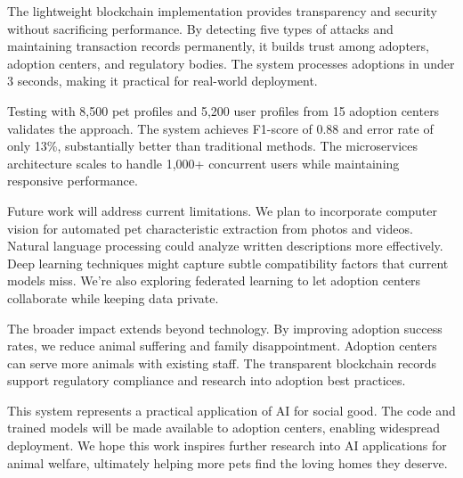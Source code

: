 \documentclass[conference]{IEEEtran}
\begin{document}
The lightweight blockchain implementation provides transparency and security without sacrificing performance. By detecting five types of attacks and maintaining transaction records permanently, it builds trust among adopters, adoption centers, and regulatory bodies. The system processes adoptions in under 3 seconds, making it practical for real-world deployment.

Testing with 8,500 pet profiles and 5,200 user profiles from 15 adoption centers validates the approach. The system achieves F1-score of 0.88 and error rate of only 13\%, substantially better than traditional methods. The microservices architecture scales to handle 1,000+ concurrent users while maintaining responsive performance.

Future work will address current limitations. We plan to incorporate computer vision for automated pet characteristic extraction from photos and videos. Natural language processing could analyze written descriptions more effectively. Deep learning techniques might capture subtle compatibility factors that current models miss. We're also exploring federated learning to let adoption centers collaborate while keeping data private.

The broader impact extends beyond technology. By improving adoption success rates, we reduce animal suffering and family disappointment. Adoption centers can serve more animals with existing staff. The transparent blockchain records support regulatory compliance and research into adoption best practices.

This system represents a practical application of AI for social good. The code and trained models will be made available to adoption centers, enabling widespread deployment. We hope this work inspires further research into AI applications for animal welfare, ultimately helping more pets find the loving homes they deserve.
\end{document}
